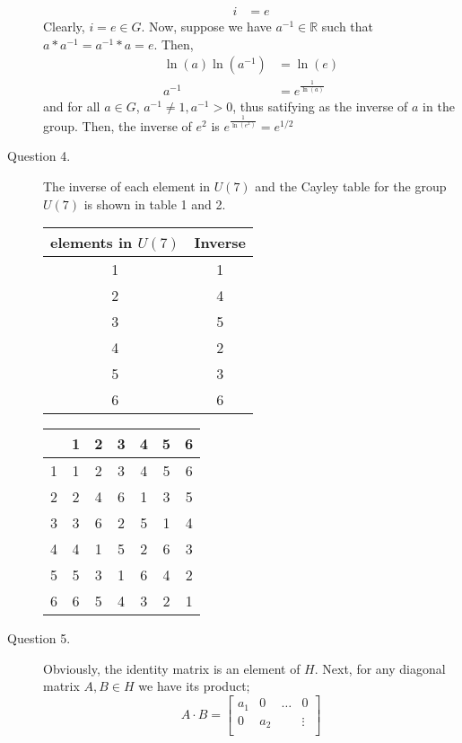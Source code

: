\documentclass[]{article}
\newcommand{\R}{\mathbb{R}}
\begin{document}
\begin{description}
\begin{align*}
        i &= e
    \end{align*} Clearly, $i = e \in G$. Now, suppose we have $a^{-1} \in \R$ such that $a*a^{-1} = a^{-1}*a = e$. Then, \begin{align*}
        \ln(a){\ln(a^{-1})} &= \ln(e)\\
        a^{-1}&= e^{\frac{1}{\ln(a)}}
    \end{align*} and for all $a \in G$, $a^{-1} \neq 1, a^{-1} >0$, thus satifying as the inverse of $a$ in the group. Then, the inverse of $e^2$ is $e^{\frac{1}{\ln(e^2)}} = e^{1/2}$ 
    \item[Question 4.] The inverse of each element in $U(7)$ and the Cayley table for the group $U(7)$ is shown in table 1 and 2.\\
\begin{minipage}[c]{0.5\textwidth}
\centering
\begin{tabular}{|c|c|}
\hline
elements in $U(7)$ & Inverse \\
\hline
 1 & 1 \\
\hline 
 2 & 4 \\
\hline
 3 & 5 \\
\hline
 4 & 2 \\
\hline 
 5 & 3 \\
\hline
 6 & 6 \\
\hline
\end{tabular}
\end{minipage}
\begin{minipage}[c]{0.5\textwidth}
\centering
\begin{tabular}{c|cccccc}
    &1&2&3&4&5&6\\
    \hline
    1 &1&2&3&4&5&6\\
    2 &2&4&6&1&3&5\\
    3 &3&6&2&5&1&4\\
    4 &4&1&5&2&6&3\\
    5 &5&3&1&6&4&2\\
    6 &6&5&4&3&2&1
\end{tabular}
\end{minipage}
\item[Question 5. ] Obviously, the identity matrix is an element of $H$. Next, for any diagonal matrix $A,B \in H$ we have its product; \[
 A \cdot B = 
 \begin{bmatrix}
    a_1 & 0 & \dots & 0\\
    0 & a_2 && \vdots\\

\end{bmatrix}\]
\end{description}
\end{document}
